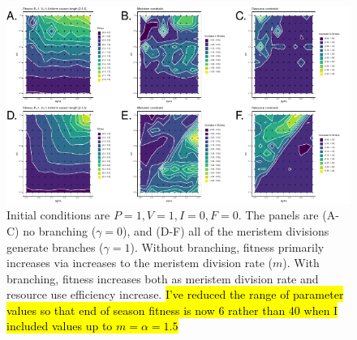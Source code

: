 \documentclass[12pt, oneside,a4paper]{article}   	%
\begin{document}
\begin{figure}[h]
	\includegraphics[page=1,width=\textwidth]{figure-1} %
        \caption{ Initial conditions are $P=1, V=1, I=0, F=0$. The panels are (A-C) no branching ($\gamma=0$), and (D-F) all of the meristem divisions generate branches ($\gamma=1$). Without branching, fitness primarily increases via increases to the meristem division rate ($m$). With branching, fitness increases both as meristem division rate and resource use efficiency increase. \hl{I've reduced the range of parameter values so that end of season fitness is now 6 rather than 40 when I included values up to $m=\alpha=1.5$} }
        \label{fig:intro-figure}
\end{figure}
\end{document}
